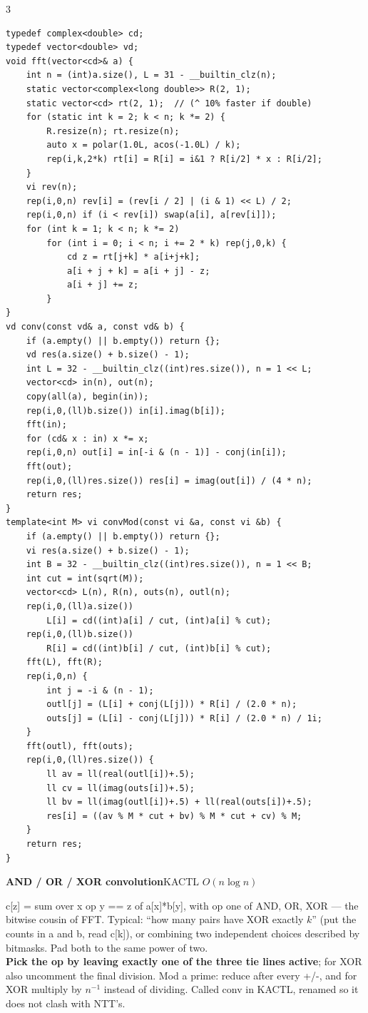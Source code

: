 \documentclass[9pt,a4paper]{extarticle}
\newcommand{\entry}[3]{%
  \addcontentsline{toc}{subsection}{#1}%
  \vspace{0.8ex}%
  \noindent\colorbox{hdbg}{\parbox{\dimexpr\columnwidth-2\fboxsep}{%
    \strut\textbf{#1}\hfill{\footnotesize\textsf{#2}}}}\par
  \vspace{0.4ex}%
  {\footnotesize #3\par}%
}
\newcommand{\code}[1]{{\ttfamily\small #1}}
\begin{document}
\begin{multicols*}{3}
\begin{lstlisting}
typedef complex<double> cd;
typedef vector<double> vd;
void fft(vector<cd>& a) {
    int n = (int)a.size(), L = 31 - __builtin_clz(n);
    static vector<complex<long double>> R(2, 1);
    static vector<cd> rt(2, 1);  // (^ 10% faster if double)
    for (static int k = 2; k < n; k *= 2) {
        R.resize(n); rt.resize(n);
        auto x = polar(1.0L, acos(-1.0L) / k);
        rep(i,k,2*k) rt[i] = R[i] = i&1 ? R[i/2] * x : R[i/2];
    }
    vi rev(n);
    rep(i,0,n) rev[i] = (rev[i / 2] | (i & 1) << L) / 2;
    rep(i,0,n) if (i < rev[i]) swap(a[i], a[rev[i]]);
    for (int k = 1; k < n; k *= 2)
        for (int i = 0; i < n; i += 2 * k) rep(j,0,k) {
            cd z = rt[j+k] * a[i+j+k];
            a[i + j + k] = a[i + j] - z;
            a[i + j] += z;
        }
}
vd conv(const vd& a, const vd& b) {
    if (a.empty() || b.empty()) return {};
    vd res(a.size() + b.size() - 1);
    int L = 32 - __builtin_clz((int)res.size()), n = 1 << L;
    vector<cd> in(n), out(n);
    copy(all(a), begin(in));
    rep(i,0,(ll)b.size()) in[i].imag(b[i]);
    fft(in);
    for (cd& x : in) x *= x;
    rep(i,0,n) out[i] = in[-i & (n - 1)] - conj(in[i]);
    fft(out);
    rep(i,0,(ll)res.size()) res[i] = imag(out[i]) / (4 * n);
    return res;
}
template<int M> vi convMod(const vi &a, const vi &b) {
    if (a.empty() || b.empty()) return {};
    vi res(a.size() + b.size() - 1);
    int B = 32 - __builtin_clz((int)res.size()), n = 1 << B;
    int cut = int(sqrt(M));
    vector<cd> L(n), R(n), outs(n), outl(n);
    rep(i,0,(ll)a.size())
        L[i] = cd((int)a[i] / cut, (int)a[i] % cut);
    rep(i,0,(ll)b.size())
        R[i] = cd((int)b[i] / cut, (int)b[i] % cut);
    fft(L), fft(R);
    rep(i,0,n) {
        int j = -i & (n - 1);
        outl[j] = (L[i] + conj(L[j])) * R[i] / (2.0 * n);
        outs[j] = (L[i] - conj(L[j])) * R[i] / (2.0 * n) / 1i;
    }
    fft(outl), fft(outs);
    rep(i,0,(ll)res.size()) {
        ll av = ll(real(outl[i])+.5);
        ll cv = ll(imag(outs[i])+.5);
        ll bv = ll(imag(outl[i])+.5) + ll(real(outs[i])+.5);
        res[i] = ((av % M * cut + bv) % M * cut + cv) % M;
    }
    return res;
}
\end{lstlisting}

\entry{AND / OR / XOR convolution}{KACTL \quad $O(n \log n)$}{%
\code{c[z] = sum over x op y == z of a[x]*b[y]}, with op one of AND, OR, XOR --- the
bitwise cousin of FFT. Typical: ``how many pairs have XOR exactly $k$'' (put the counts
in \code{a} and \code{b}, read \code{c[k]}), or combining two independent choices
described by bitmasks. Pad both to the same power of two.\\[0.3ex]
\textbf{Pick the op by leaving exactly one of the three \code{tie} lines active}; for
XOR also uncomment the final division. Mod a prime: reduce after every \code{+}/\code{-},
and for XOR multiply by $n^{-1}$ instead of dividing. Called \code{conv} in KACTL,
renamed so it does not clash with NTT's.}


\end{multicols*}
\end{document}
